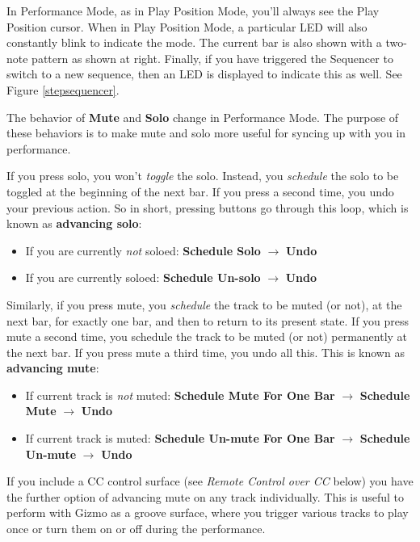 \documentclass{article}
\begin{document}
In Performance Mode, as in Play Position Mode, you'll always see the Play Position cursor.  When in Play Position Mode, a particular LED will also constantly blink to indicate the mode.  The current bar is also shown with a two-note pattern as shown at right.  Finally, if you have triggered the Sequencer to switch to a new sequence, then an LED is displayed to indicate this as well. See Figure \ref{stepsequencer}.

The behavior of {\bf Mute} and {\bf Solo} change in Performance Mode. The purpose of these behaviors is to make mute and solo more useful for syncing up with you in performance.

If you press solo, you won't {\it toggle} the solo.  Instead, you {\it schedule} the solo to be toggled at the beginning of the next bar.  If you press a second time, you undo your previous action.  So in short, pressing buttons go through this loop, which is known as {\bf advancing solo}:

\begin{itemize}
\item If you are currently {\it not} soloed: {\bf Schedule Solo} \(\rightarrow\) {\bf Undo}
\item If you are currently soloed: {\bf Schedule Un-solo} \(\rightarrow\) {\bf Undo}
\end{itemize}


Similarly, if you press mute, you {\it schedule} the track to be muted (or not), at the next bar, for exactly one bar, and then to return to its present state.  If you press mute a second time, you schedule the track to be muted (or not) permanently at the next bar.  If you press mute a third time, you undo all this.  This is known as {\bf advancing mute}:

\begin{itemize}
\item If current track is {\it not} muted: {\bf Schedule Mute For One Bar} \(\rightarrow\)  {\bf Schedule Mute} \(\rightarrow\) {\bf Undo}
\item If current track is muted: {\bf Schedule Un-mute For One Bar} \(\rightarrow\)  {\bf Schedule Un-mute} \(\rightarrow\) {\bf Undo}
\end{itemize}

If you include a CC control surface (see {\it Remote Control over CC} below) you have the further option of advancing mute on any track individually.  This is useful to perform with Gizmo as a groove surface, where you trigger various tracks to play once or turn them on or off during the performance.
\end{document}
